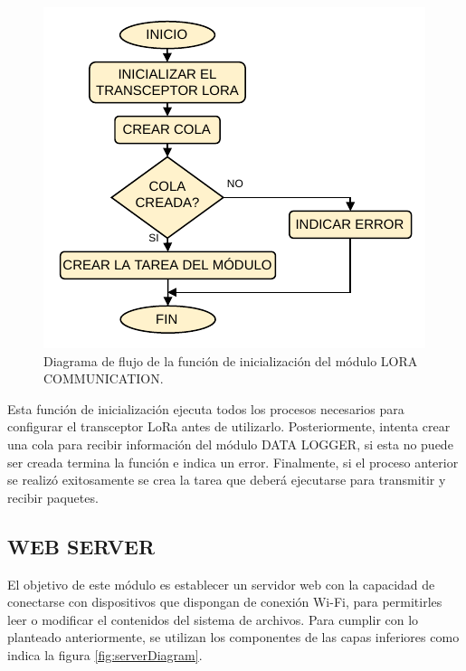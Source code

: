 \begin{figure}[h]
	\centering
	\includegraphics[scale=1]{./Figures/lora_communication_init.pdf}
	\caption{Diagrama de flujo de la función de inicialización del módulo LORA COMMUNICATION.}
		\label{fig:loraInit}
\end{figure}

Esta función de inicialización ejecuta todos los procesos necesarios para configurar el transceptor LoRa antes de utilizarlo. Posteriormente, intenta crear una cola para recibir información del módulo DATA LOGGER, si esta no puede ser creada termina la función e indica un error. Finalmente, si el proceso anterior se realizó exitosamente se crea la tarea que deberá ejecutarse para transmitir y recibir paquetes. 

\subsection{WEB SERVER}

El objetivo de este módulo es establecer un servidor web con la capacidad de conectarse con dispositivos que dispongan de conexión Wi-Fi, para permitirles leer o modificar el contenidos del sistema de archivos. Para cumplir con lo planteado anteriormente, se utilizan los componentes de las capas inferiores como indica la figura \ref{fig:serverDiagram}.

